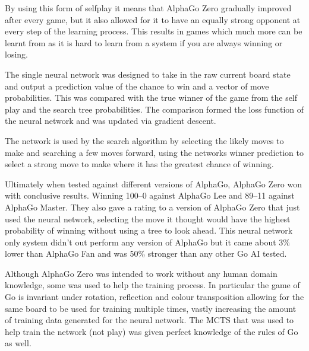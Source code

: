 \documentclass[a4paper]{article}
\begin{document}
By using this form of selfplay it means that AlphaGo Zero gradually improved after every game, but it also allowed for it to have an equally strong opponent at every step of the learning process.
This results in games which much more can be learnt from as it is hard to learn from a system if you are always winning or losing.
\par
The single neural network was designed to take in the raw current board state and output a prediction value of the chance to win and a vector of move probabilities.
This was compared with the true winner of the game from the self play and the search tree probabilities.
The comparison formed the loss function of the neural network and was updated via gradient descent.
\par
The network is used by the search algorithm by selecting the likely moves to make and searching a few moves forward, using the networks winner prediction to select a strong move to make where it has the greatest chance of winning.
\par
Ultimately when tested against different versions of AlphaGo, AlphaGo Zero won with conclusive results.
Winning 100--0 against AlphaGo Lee and 89--11 against AlphaGo Master.
They also gave a rating to a version of AlphaGo Zero that just used the neural network, selecting the move it thought would have the highest probability of winning without using a tree to look ahead.
This neural network only system didn't out perform any version of AlphaGo but it came about 3\% lower than AlphaGo Fan and was 50\% stronger than any other Go AI tested.
\par
Although AlphaGo Zero was intended to work without any human domain knowledge, some was used to help the training process.
In particular the game of Go is invariant under rotation, reflection and colour transposition allowing for the same board to be used for training multiple times, vastly increasing the amount of training data generated for the neural network.
The MCTS that was used to help train the network (not play) was given perfect knowledge of the rules of Go as well.
\end{document}
